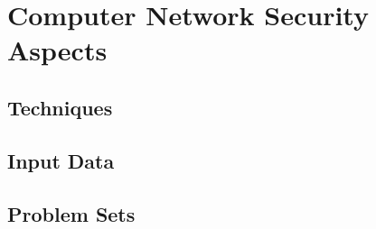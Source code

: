 
\chapter{Computer Network Security Aspects}

\section{Techniques}

\section{Input Data}

\section{Problem Sets}
